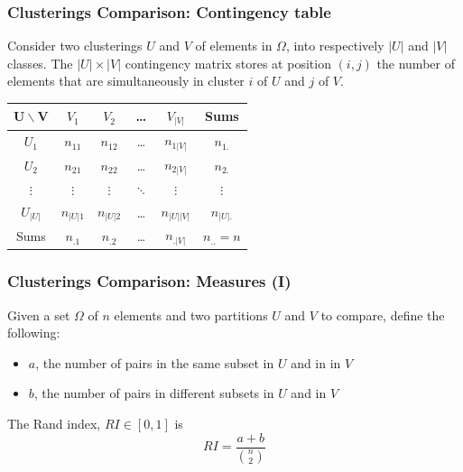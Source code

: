 \documentclass{beamer}\usepackage[]{graphicx}\usepackage[]{color}
\begin{document}
\begin{frame}
  \frametitle{Clusterings Comparison: Contingency table}

  \begin{definition}
    Consider two clusterings $U$ and $V$ of elements in $\Omega$, into respectively $|U|$ and $|V|$ classes. The $|U| \times |V|$ contingency matrix stores at position $(i,j)$ the number of elements that
are simultaneously in cluster $i$ of $U$ and  $j$ of $V$.

\begin{center}  
  \begin{tabular}{c|cccc|c}
  $\mathbf{U}\backslash \mathbf{V}$ & $V_1$ & $V_2$ & \dots & $V_{|V|}$ & Sums \\ \hline  
  $U_1$ & $n_{11}$ & $n_{12}$ & \dots & $n_{1|V|}$ & $n_{1.}$ \\ 
  $U_2$ & $n_{21}$ & $n_{22}$ & \dots & $n_{2|V|}$ & $n_{2.}$ \\ 
  $\vdots$ & $\vdots$ & $\vdots$ & $\ddots$ & $\vdots$ & $\vdots$ \\
  $U_{|U|}$ & $n_{|U|1}$ & $n_{|U|2}$ & \dots & $n_{|U| |V|}$ & $n_{|U|.}$ \\ \hline
  Sums & $n_{.1}$ & $n_{.2}$ & \dots & $n_{.|V|}$ & $n_{..}=n$ \\
\end{tabular}
\end{center}  

  \end{definition}
  
\end{frame}

\begin{frame}
  \frametitle{Clusterings Comparison: Measures (I)}

\begin{definition}
  Given a set $\Omega$ of $n$ elements and two partitions $U$ and $V$ to compare, define the following:
\begin{itemize}
\item  $a$, the number of pairs in the same subset in $U$ and in in $V$
\item  $b$, the number of pairs in different subsets in $U$ and in $V$
\end{itemize}
The Rand index, $RI \in[0,1]$ is
\begin{equation*}
  RI = \frac {a+b}{{n \choose 2}}
\end{equation*}
  \end{definition}

\end{frame}
\end{document}
